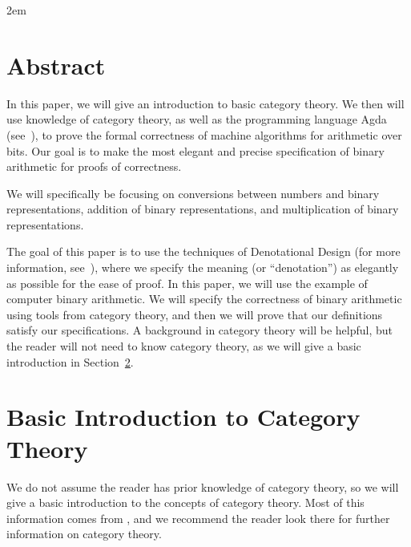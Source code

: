 \documentclass[14pt]{extarticle}  %
\begin{document}

\maketitle
\mathindent2em


\tableofcontents
\section{Abstract}
In this paper, we will give an introduction to basic category theory. We then will use knowledge of category theory, as well as the programming language Agda (see~\cite{agda}), to
prove the formal correctness of machine algorithms for arithmetic over bits. Our goal is to make the most elegant and precise specification of binary arithmetic for proofs of correctness.

We will specifically be focusing on conversions between numbers and binary representations, addition of binary representations, and multiplication of binary representations.

The goal of this paper is to use the techniques of Denotational Design (for more information, see~\cite{conal}), where we specify the meaning (or ``denotation'')
as elegantly as possible for the ease of proof. In this paper, we will use the example of computer binary arithmetic. We will specify the correctness of binary arithmetic
using tools from category theory, and then we will prove that our definitions satisfy our specifications. A background in category theory will be helpful, but the reader
will not need to know category theory, as we will give a basic introduction in Section~\ref{sec:cat}.

\section{Basic Introduction to Category Theory}\label{sec:cat}
We do not assume the reader has prior knowledge of category theory, so we will give a basic introduction to the concepts of category theory.
Most of this information comes from \cite{cats}, and we recommend the reader look there for further information on category theory.
\end{document}
